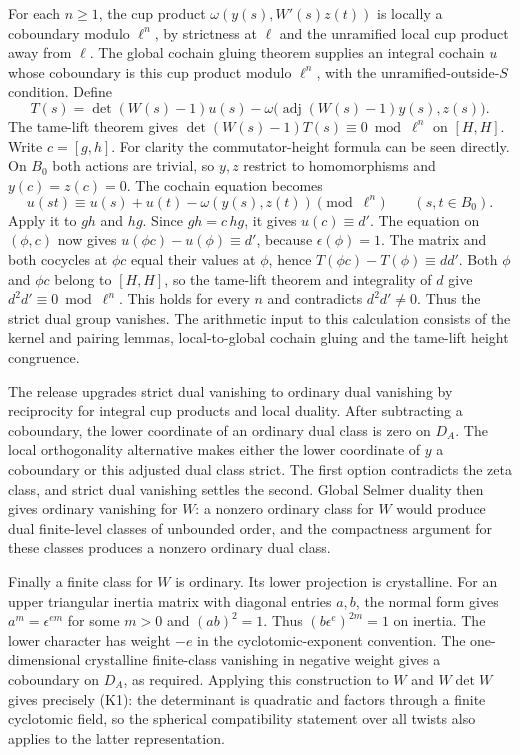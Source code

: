 For each \(n\ge1\), the cup product
\(\omega(y(s),W'(s)z(t))\) is locally a coboundary modulo
\(\ell^n\), by strictness at \(\ell\) and the unramified local cup
product away from \(\ell\). The global cochain gluing theorem
supplies an integral cochain \(u\) whose coboundary is this cup
product modulo \(\ell^n\), with the unramified-outside-\(S\)
condition. Define
\[
 T(s)=\det(W(s)-1)u(s)
  -\omega\bigl(\operatorname{adj}(W(s)-1)y(s),z(s)\bigr).
\]
The tame-lift theorem gives
\(\det(W(s)-1)T(s)\equiv0\bmod\ell^n\) on \([H,H]\).
Write \(c=[g,h]\). For clarity the commutator-height formula can
be seen directly. On \(B_0\) both actions are trivial, so \(y,z\)
restrict to homomorphisms and \(y(c)=z(c)=0\).
The cochain equation becomes
\[
 u(st)\equiv u(s)+u(t)-\omega(y(s),z(t))\pmod{\ell^n}
 \qquad(s,t\in B_0).
\]
Apply it to \(gh\) and \(hg\). Since \(gh=c\,hg\), it gives
\(u(c)\equiv d'\). The equation on \((\phi,c)\) now gives
\(u(\phi c)-u(\phi)\equiv d'\), because \(\epsilon(\phi)=1\).
The matrix and both cocycles at \(\phi c\) equal their values at
\(\phi\), hence \(T(\phi c)-T(\phi)\equiv dd'\). Both \(\phi\) and
\(\phi c\) belong to \([H,H]\), so the tame-lift theorem and
integrality of \(d\) give \(d^2d'\equiv0\bmod\ell^n\).
This holds for every \(n\) and contradicts \(d^2d'\ne0\).
Thus the strict dual group vanishes. The arithmetic input to
this calculation consists of the kernel and pairing lemmas,
local-to-global cochain gluing and the tame-lift height congruence.

The release upgrades strict dual vanishing to ordinary dual
vanishing by reciprocity for integral cup products and local
duality. After subtracting a coboundary, the lower coordinate
of an ordinary dual class is zero on \(D_A\). The local orthogonality
alternative makes either the lower coordinate of \(y\) a coboundary
or this adjusted dual class strict. The first option contradicts the
zeta class, and strict dual vanishing settles the second. Global
Selmer duality then gives ordinary vanishing for \(W\): a nonzero
ordinary class for \(W\) would produce dual finite-level classes
of unbounded order, and the compactness argument for these classes
produces a nonzero ordinary dual class.

Finally a finite class for \(W\) is ordinary. Its lower projection
is crystalline. For an upper triangular inertia matrix with diagonal
entries \(a,b\), the normal form gives \(a^m=\epsilon^{em}\)
for some \(m>0\) and \((ab)^2=1\). Thus
\((b\epsilon^e)^{2m}=1\) on inertia. The lower character has
weight \(-e\) in the cyclotomic-exponent convention. The
one-dimensional crystalline finite-class vanishing in negative weight
gives a coboundary on \(D_A\), as required. Applying this construction
to \(W\) and \(W\det W\) gives precisely (K1): the determinant
is quadratic and factors through a finite cyclotomic field, so the
spherical compatibility statement over all twists also applies to
the latter representation.


